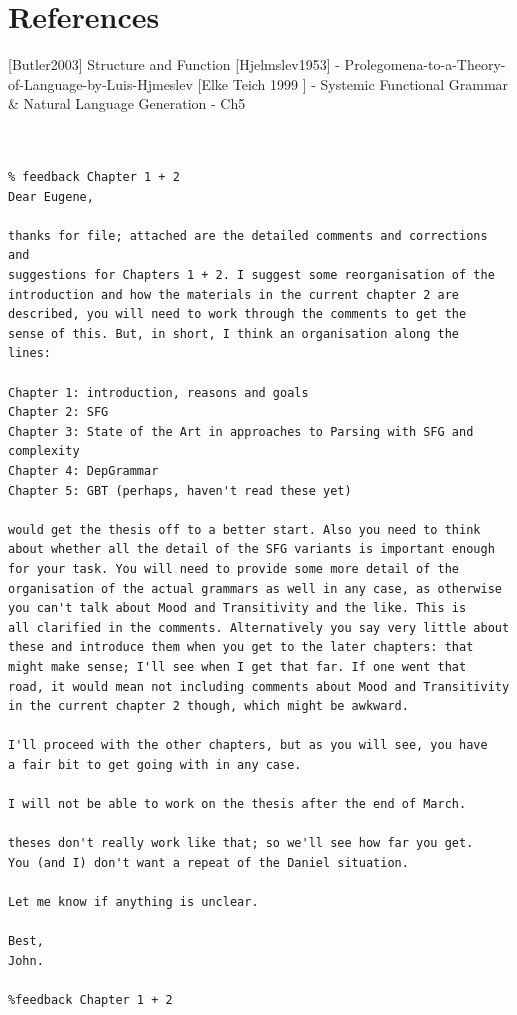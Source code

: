 \section{References}

[Butler2003] Structure and Function 
[Hjelmslev1953] - Prolegomena-to-a-Theory-of-Language-by-Luis-Hjmeslev
[Elke Teich 1999 ] - Systemic Functional Grammar \& Natural Language Generation - Ch5



\begin{Verbatim}


% feedback Chapter 1 + 2
Dear Eugene,

thanks for file; attached are the detailed comments and corrections and
suggestions for Chapters 1 + 2. I suggest some reorganisation of the
introduction and how the materials in the current chapter 2 are described, you will need to work through the comments to get the
sense of this. But, in short, I think an organisation along the
lines:

Chapter 1: introduction, reasons and goals
Chapter 2: SFG
Chapter 3: State of the Art in approaches to Parsing with SFG and complexity
Chapter 4: DepGrammar
Chapter 5: GBT (perhaps, haven't read these yet)

would get the thesis off to a better start. Also you need to think
about whether all the detail of the SFG variants is important enough
for your task. You will need to provide some more detail of the
organisation of the actual grammars as well in any case, as otherwise
you can't talk about Mood and Transitivity and the like. This is
all clarified in the comments. Alternatively you say very little about
these and introduce them when you get to the later chapters: that
might make sense; I'll see when I get that far. If one went that
road, it would mean not including comments about Mood and Transitivity
in the current chapter 2 though, which might be awkward.

I'll proceed with the other chapters, but as you will see, you have
a fair bit to get going with in any case.

I will not be able to work on the thesis after the end of March. 

theses don't really work like that; so we'll see how far you get.
You (and I) don't want a repeat of the Daniel situation.

Let me know if anything is unclear.

Best,
John.

%feedback Chapter 1 + 2


\end{Verbatim}
